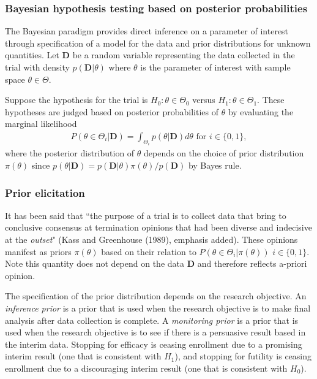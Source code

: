 \documentclass[12pt]{article}
\begin{document}
\subsubsection{Bayesian hypothesis testing based on posterior probabilities}

The Bayesian paradigm provides direct inference on a parameter of interest through specification of a model for the data and prior distributions for unknown quantities. Let $\mathbf{D}$ be a random variable representing the data collected in the trial with density $p(\mathbf{D}|\theta)$ where $\theta$ is the parameter of interest with sample space $\theta\in\Theta$. 

Suppose the hypothesis for the trial is $H_0:\theta\in\Theta_0$ versus $H_1:\theta\in\Theta_1$. These hypotheses are judged based on posterior probabilities of $\theta$ by evaluating the marginal likelihood 
\begin{align}\label{eq:equation1}
P(\theta\in\Theta_i|\mathbf{D})=\int_{\Theta_i}p(\theta|\mathbf{D})d\theta\text{ for }i\in\{0,1\},
\end{align}
where the posterior distribution of $\theta$ depends on the choice of prior distribution $\pi(\theta)$ since $p(\theta|\mathbf{D})=p(\mathbf{D}|\theta)\pi(\theta)/p(\mathbf{D})$ by Bayes rule.
\subsubsection{Prior elicitation}
It has been said that ``the purpose of a trial is to collect data that bring to conclusive consensus at termination opinions that had been diverse and indecisive at the \textit{outset}" (Kass and Greenhouse (1989), emphasis added). These opinions manifest as priors $\pi(\theta)$ based on their relation to $P(\theta\in\Theta_i|\pi(\theta))$ $i\in\{0,1\}$. Note this quantity does not depend on the data $\mathbf{D}$ and therefore reflects a-priori opinion.

 The specification of the prior distribution depends on the research objective. An \textit{inference prior} is a prior that is used when the research objective is to make final analysis after data collection is complete. A \textit{monitoring prior} is a prior that is used when the research objective is to see if there is a persuasive result based in the interim data. Stopping for efficacy is ceasing enrollment due to a promising interim result (one that is consistent with $H_1$), and stopping for futility is ceasing enrollment due to a discouraging interim result (one that is consistent with $H_0$).
\end{document}
